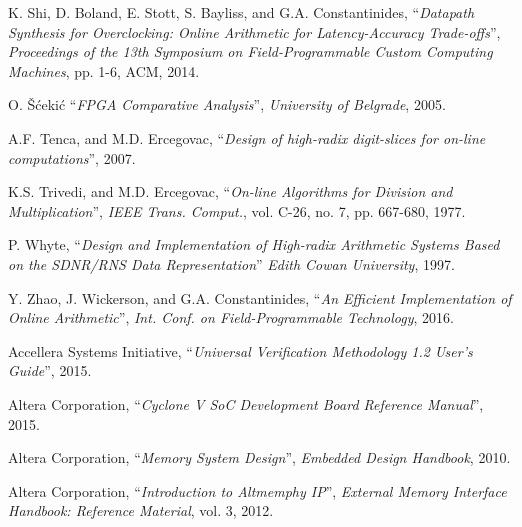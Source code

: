 \begin{thebibliography}{1}
  K. Shi, D. Boland, E. Stott, S. Bayliss, and G.A. Constantinides,
  ``\textit{Datapath Synthesis for Overclocking: Online Arithmetic for
  Latency-Accuracy Trade-offs}'',
  \textit{Proceedings of the 13th Symposium on Field-Programmable Custom
  Computing Machines},
  pp. 1-6, ACM,
  2014.

  O. Šćekić
  ``\textit{FPGA Comparative Analysis}'',
  \textit{University of Belgrade},
  2005.

  A.F. Tenca, and M.D. Ercegovac,
  ``\textit{Design of high-radix digit-slices for on-line computations}'',
  2007.

  K.S. Trivedi, and M.D. Ercegovac,
  ``\textit{On-line Algorithms for Division and Multiplication}'',
  \textit{IEEE Trans. Comput.}, vol. C-26, no. 7, pp. 667-680,
  1977.

  P. Whyte,
  ``\textit{Design and Implementation of High-radix Arithmetic Systems Based
  on the SDNR/RNS Data Representation}''
  \textit{Edith Cowan University},
  1997.

  Y. Zhao, J. Wickerson, and G.A. Constantinides,
  ``\textit{An Efficient Implementation of Online Arithmetic}'',
  \textit{Int. Conf. on Field-Programmable Technology},
  2016.


  Accellera Systems Initiative,
  ``\textit{Universal Verification Methodology 1.2 User’s Guide}'',
  2015.

  Altera Corporation,
  ``\textit{Cyclone V SoC Development Board Reference Manual}'',
  2015.

  Altera Corporation,
  ``\textit{Memory System Design}'',
  \textit{Embedded Design Handbook},
  2010.

  Altera Corporation,
  ``\textit{Introduction to Altmemphy IP}'',
  \textit{External Memory Interface Handbook: Reference Material}, vol. 3,
  2012.


\end{thebibliography}
